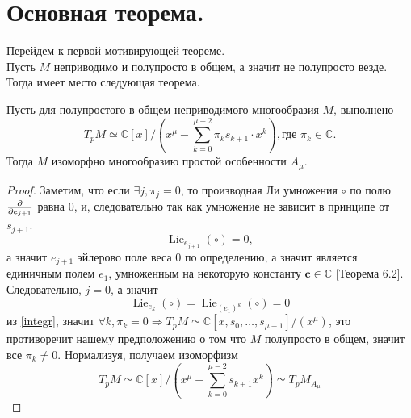 \section{Основная теорема.}
Перейдем к первой мотивирующей теореме.\\
Пусть \(M\) неприводимо и полупросто в общем, а значит не полупросто везде. Тогда имеет место следующая теорема.
\begin{theorem}
	Пусть для полупростого в общем неприводимого многообразия \(M\), выполнено
	\[
	T_pM \simeq \mathbb{C}[x]/\left(x^{\mu} - \sum_{k = 0}^{\mu - 2} \pi_k s_{k+1} \cdot x^k\right), \text{где } \pi_k \in \mathbb{C}.
	\]  Тогда \(M\) изоморфно многообразию простой особенности \(A_{\mu}\).
\end{theorem}
\begin{proof}
	Заметим, что если \(\exists j, \pi_j = 0\), то производная Ли умножения \(\circ\) по полю \(\tang[e_{j+1}]\) равна 0, и, следовательно так как умножение не зависит в принципе от \(s_{j+1}\).\[\operatorname{Lie}_{e_{j+1}}(\circ) = 0,\] а значит \(e_{j+1}\) эйлерово поле веса 0 по определению, а значит является единичным полем \(e_1\), умноженным на некоторую константу \(\mathbf{c}\in \mathbb{C}\) [Теорема 6.2]\cite{hertling1999multiplicationtangentbundle}. Следовательно, \(j=0\), а значит \[\operatorname{Lie}_{e_k}(\circ) = \operatorname{Lie}_{(e_1)^k}(\circ) = 0 \] из \ref{integr}, значит \(\forall k, \pi_k =0 \Rightarrow T_pM \simeq \mathbb{C}\left[x, s_0, \dots, s_{\mu - 1}\right]/ (x^\mu)\), это противоречит нашему предположению о том что \(M\) полупросто в общем, значит все \(\pi_k \neq 0\). Нормализуя, получаем изоморфизм \[ T_pM \simeq \mathbb{C}[x]/\left(x^{\mu} - \sum_{k = 0}^{\mu - 2} s_{k+1} x^k\right)\simeq T_pM_{A_\mu}\]
\end{proof}
